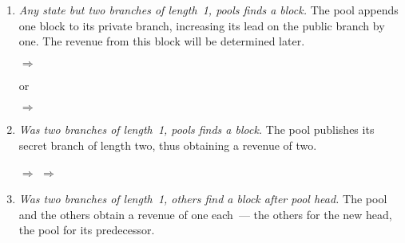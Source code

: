 \documentclass[letterpaper]{llncs}
\begin{document}
\begin{enumerate}[label=(\alph*)] 
\item \emph{Any state but two branches of length~1, pools finds a block.} 
The pool appends one block to its private branch, increasing its lead on the public branch by one. The revenue from this block will be determined later. \label{itm:pool} 

\centerline{
    {\Large \hspace{0.0cm} $\Longrightarrow$ \hspace{0.0cm}}
}

or

\centerline{
    {\Large \hspace{0.0cm} $\Longrightarrow$ \hspace{0.0cm}}
}

\vspace{0.5\baselineskip}

\item \emph{Was two branches of length~1, pools finds a block.}
The pool publishes its secret branch of length two, thus obtaining a revenue of two. \label{itm:poolPoolZeroPrime} 

\vspace{0.5\baselineskip}

\centerline{
    {\Large \hspace{0.0cm} $\Longrightarrow$ \hspace{0.0cm}}
    {\Large \hspace{0.0cm} $\Longrightarrow$ \hspace{0.0cm}}
}

\vspace{0.5\baselineskip}

\item \emph{Was two branches of length~1, others find a block after pool head.} 
The pool and the others obtain a revenue of one each~--- the others for the new head, the pool for its predecessor. \label{itm:poolOthersZeroPrime}

\vspace{0.5\baselineskip}


\end{enumerate}
\end{document}
